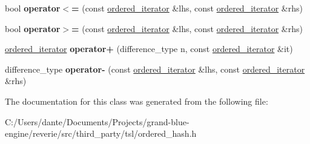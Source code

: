 \begin{DoxyCompactItemize}
\item 
\mbox{\label{classtsl_1_1detail__ordered__hash_1_1ordered__hash_1_1ordered__iterator_afd4e7402637e34d2bf465a6b0b1be8a7}} 
bool {\bfseries operator$<$=} (const \mbox{\hyperlink{classtsl_1_1detail__ordered__hash_1_1ordered__hash_1_1ordered__iterator}{ordered\+\_\+iterator}} \&lhs, const \mbox{\hyperlink{classtsl_1_1detail__ordered__hash_1_1ordered__hash_1_1ordered__iterator}{ordered\+\_\+iterator}} \&rhs)
\item 
\mbox{\label{classtsl_1_1detail__ordered__hash_1_1ordered__hash_1_1ordered__iterator_aa60c2110999d08a68505c1e6c86e0ce3}} 
bool {\bfseries operator$>$=} (const \mbox{\hyperlink{classtsl_1_1detail__ordered__hash_1_1ordered__hash_1_1ordered__iterator}{ordered\+\_\+iterator}} \&lhs, const \mbox{\hyperlink{classtsl_1_1detail__ordered__hash_1_1ordered__hash_1_1ordered__iterator}{ordered\+\_\+iterator}} \&rhs)
\item 
\mbox{\label{classtsl_1_1detail__ordered__hash_1_1ordered__hash_1_1ordered__iterator_a52a408a28fa385a7ebafd1e24b54aadc}} 
\mbox{\hyperlink{classtsl_1_1detail__ordered__hash_1_1ordered__hash_1_1ordered__iterator}{ordered\+\_\+iterator}} {\bfseries operator+} (difference\+\_\+type n, const \mbox{\hyperlink{classtsl_1_1detail__ordered__hash_1_1ordered__hash_1_1ordered__iterator}{ordered\+\_\+iterator}} \&it)
\item 
\mbox{\label{classtsl_1_1detail__ordered__hash_1_1ordered__hash_1_1ordered__iterator_a48876502803e0c320529a1edb184a250}} 
difference\+\_\+type {\bfseries operator-\/} (const \mbox{\hyperlink{classtsl_1_1detail__ordered__hash_1_1ordered__hash_1_1ordered__iterator}{ordered\+\_\+iterator}} \&lhs, const \mbox{\hyperlink{classtsl_1_1detail__ordered__hash_1_1ordered__hash_1_1ordered__iterator}{ordered\+\_\+iterator}} \&rhs)
\end{DoxyCompactItemize}


The documentation for this class was generated from the following file\+:\begin{DoxyCompactItemize}
\item 
C\+:/\+Users/dante/\+Documents/\+Projects/grand-\/blue-\/engine/reverie/src/third\+\_\+party/tsl/ordered\+\_\+hash.\+h\end{DoxyCompactItemize}
